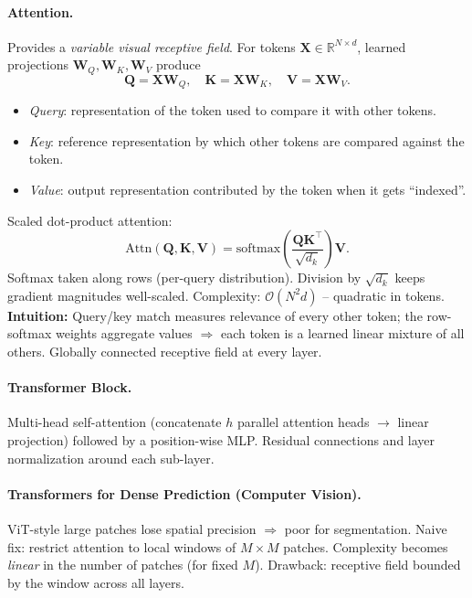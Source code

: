 \documentclass{article}
\begin{document}
\paragraph{Attention.}
Provides a \textit{variable visual receptive field}. For tokens $\mathbf{X} \in \mathbb{R}^{N \times d}$, learned projections $\mathbf{W}_Q, \mathbf{W}_K, \mathbf{W}_V$ produce
\begin{equation*}
    \mathbf{Q} = \mathbf{X}\mathbf{W}_Q, \quad \mathbf{K} = \mathbf{X}\mathbf{W}_K, \quad \mathbf{V} = \mathbf{X}\mathbf{W}_V.
\end{equation*}
\begin{itemize}
    \item \textit{Query}: representation of the token used to compare it with other tokens.
    \item \textit{Key}: reference representation by which other tokens are compared against the token.
    \item \textit{Value}: output representation contributed by the token when it gets ``indexed''.
\end{itemize}
Scaled dot-product attention:
\begin{equation*}
    \mathrm{Attn}(\mathbf{Q}, \mathbf{K}, \mathbf{V}) = \mathrm{softmax}\!\left(\frac{\mathbf{Q}\mathbf{K}^\top}{\sqrt{d_k}}\right) \mathbf{V}.
\end{equation*}
Softmax taken along rows (per-query distribution). Division by $\sqrt{d_k}$ keeps gradient magnitudes well-scaled. Complexity: $\mathcal{O}(N^2 d)$ -- quadratic in tokens.\\

\textbf{Intuition:} Query/key match measures relevance of every other token; the row-softmax weights aggregate values $\Rightarrow$ each token is a learned linear mixture of all others. Globally connected receptive field at every layer.

\paragraph{Transformer Block.} Multi-head self-attention (concatenate $h$ parallel attention heads $\to$ linear projection) followed by a position-wise MLP. Residual connections and layer normalization around each sub-layer.

\paragraph{Transformers for Dense Prediction (Computer Vision).}
ViT-style large patches lose spatial precision $\Rightarrow$ poor for segmentation. Naive fix: restrict attention to local windows of $M \times M$ patches. Complexity becomes \textit{linear} in the number of patches (for fixed $M$). Drawback: receptive field bounded by the window across all layers.
\end{document}
